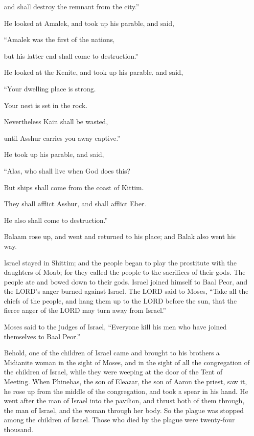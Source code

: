 and shall destroy the remnant from the city.”


\myverse{}He looked at Amalek, and took up his parable, and said,

“Amalek was the first of the nations,

but his latter end shall come to destruction.”


\myverse{}He looked at the Kenite, and took up his parable, and said,

“Your dwelling place is strong.

Your nest is set in the rock.


\myverse{}Nevertheless Kain shall be wasted,

until Asshur carries you away captive.”


\myverse{}He took up his parable, and said,

“Alas, who shall live when God does this?


\myverse{}But ships shall come from the coast of Kittim.

They shall afflict Asshur, and shall afflict Eber.

He also shall come to destruction.”


\myverse{}Balaam rose up, and went and returned to his place; and Balak
also went his way.


\mychapter{} \myverse*{}Israel stayed in Shittim; and the people began to play the prostitute
with the daughters of Moab;
\myverse{}for they called the people to the sacrifices of their gods. The people ate
and bowed down to their gods.
\myverse{}Israel joined himself to Baal Peor, and the LORD’s anger burned against Israel.
\myverse{}The LORD said to Moses, “Take all the chiefs of the people, and hang them up
to the LORD before the sun, that the fierce anger of the LORD may turn away from Israel.”


\myverse{}Moses said to the judges of Israel, “Everyone kill his men who
have joined themselves to Baal Peor.”


\myverse{}Behold, one of the children of Israel came and brought to his
brothers a Midianite woman in the sight of Moses, and in the sight of all the congregation of the children
of Israel, while they were weeping at the door of the Tent of Meeting.
\myverse{}When Phinehas, the son of Eleazar, the son of Aaron the priest, saw it, he
rose up from the middle of the congregation, and took a spear in his hand.
\myverse{}He went after the man of Israel into the pavilion, and thrust both of them
through, the man of Israel, and the woman through her body. So the plague was stopped among the children
of Israel.
\myverse{}Those who died by the plague were twenty-four thousand.


